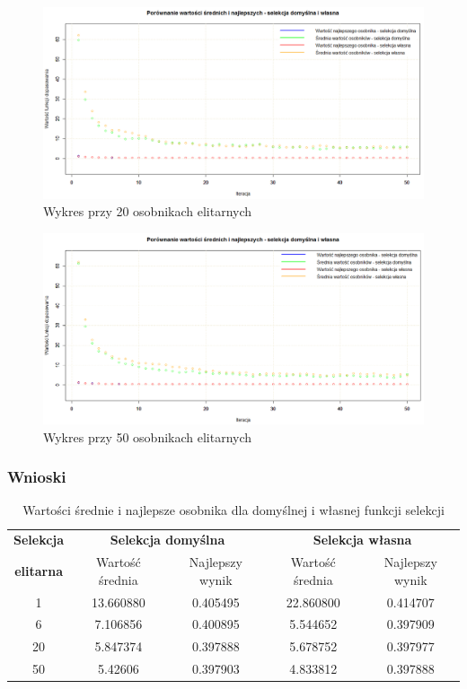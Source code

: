 \begin{figure}[H]
	\centering
	\hspace*{-0.8in}
	\includegraphics[scale = 0.5]{img/zad1/sel_20}
	\caption{Wykres przy 20 osobnikach elitarnych}  
	\label{rys:sel_20} 
\end{figure}

\begin{figure}[H]
	\centering
	\hspace*{-0.8in}
	\includegraphics[scale = 0.5]{img/zad1/sel_50}
	\caption{Wykres przy 50 osobnikach elitarnych}  
	\label{rys:sel_50} 
\end{figure}

\subsubsection{Wnioski}

\begin{table}[!h]
	\centering
	\caption{Wartości średnie i najlepsze osobnika dla domyślnej i własnej funkcji selekcji}
	\label{sel_porownanie}
	\begin{tabular}{|c|c|c|c|c|}
		\hline
		\textbf{Selekcja} & \multicolumn{2}{c}{\textbf{Selekcja domyślna}}  & \multicolumn{2}{|c|}{\textbf{Selekcja własna}} \\ \cline{2-5}
		\textbf{elitarna} & Wartość średnia & Najlepszy wynik & Wartość średnia & Najlepszy wynik \\ \hline
		
		1  & 13.660880  & 0.405495 & 22.860800 & 0.414707 \\
		6  & 7.106856 & 0.400895 & 5.544652 & 0.397909 \\
		20 & 5.847374 & 0.397888 & 5.678752 & 0.397977 \\
		50 & 5.42606 & 0.397903 & 4.833812 & 0.397888  \\ \hline      
	\end{tabular}
\end{table}